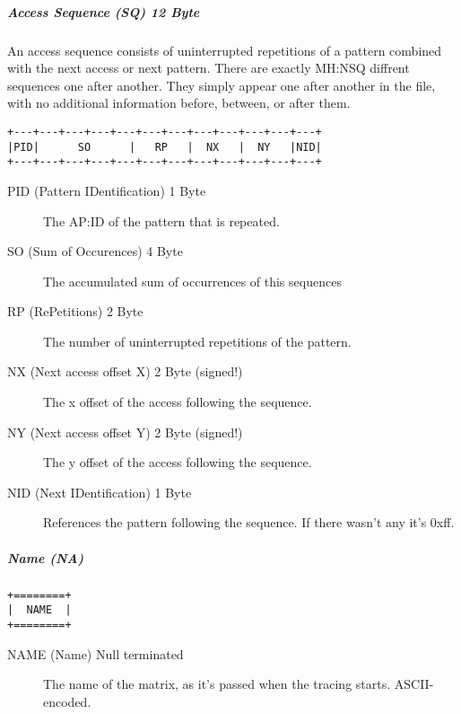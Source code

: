 \subparagraph{Access Sequence (SQ) 12 Byte}

An access sequence consists of uninterrupted repetitions of a pattern combined with the next access or next 
pattern. There are exactly MH:NSQ diffrent sequences one after another. They simply appear one after another 
in the file, with no additional information before, between, or after them.
\begin{verbatim}
+---+---+---+---+---+---+---+---+---+---+---+---+
|PID|      SO      |   RP   |  NX   |  NY   |NID|
+---+---+---+---+---+---+---+---+---+---+---+---+
\end{verbatim}
\begin{description}
\item[PID (Pattern IDentification) 1 Byte]
The AP:ID of the pattern that is repeated.
\item[SO (Sum of Occurences) 4 Byte]
The accumulated sum of occurrences of this sequences
\item[RP (RePetitions) 2 Byte]
The number of uninterrupted repetitions of the pattern.
\item[NX (Next access offset X) 2 Byte (signed!)]
The x offset of the access following the sequence.
\item[NY (Next access offset Y) 2 Byte (signed!)]
The y offset of the access following the sequence.
\item[NID (Next IDentification) 1 Byte]
References the pattern following the sequence. If there wasn't any it's 0xff.
\end{description}

\subparagraph{Name (NA)}
\begin{verbatim}
+========+
|  NAME  |
+========+
\end{verbatim}
\begin{description}
\item[NAME (Name) Null terminated]
The name of the matrix, as it's passed when the tracing starts. ASCII-encoded.
\end{description}